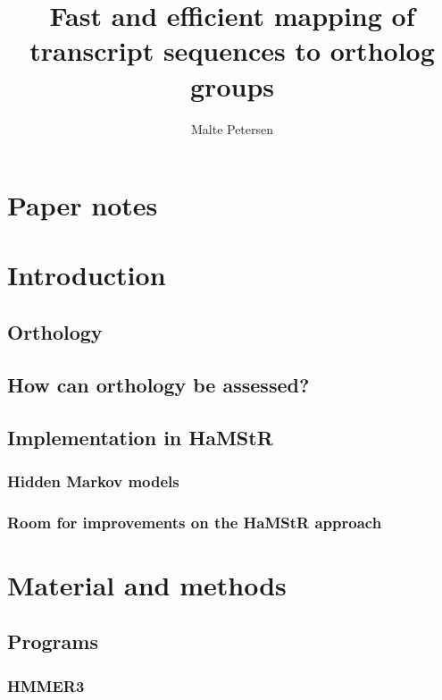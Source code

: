 \documentclass[a4paper,12.5pt]{scrreprt}
\title{Fast and efficient mapping of transcript sequences to ortholog groups}
\author{Malte Petersen}
\newcommand{\hamstr}{HaMStR\xspace}
\begin{document}
\maketitle
\tableofcontents

\chapter*{Paper notes}
	



\chapter{Introduction}
	
	\section{Orthology}
		
	\section{How can orthology be assessed?}
		
	\section{Implementation in \hamstr}
		
		\subsection{Hidden Markov models}
			
		\subsection{Room for improvements on the \hamstr approach}

\chapter{Material and methods}
	\section{Programs}
		
		
		
		\subsection{HMMER3}
			
\end{document}
